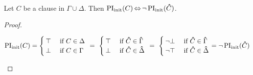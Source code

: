 \begin{lemma}
	\label{lemma:symmetry_base}
	Let $C$ be a clause in $\Gamma \cup \Delta$.
	Then $\operatorname{PI}_{\mathrm{init}}(C) \operatorname{\Leftrightarrow} \lnot \operatorname{PI}_{\mathrm{init}}(\bm\hat{C})$. 
\end{lemma}
\begin{proof}
	\begin{adjustwidth}{-1em}{}
		\[
		\operatorname{PI}_{\mathrm{init}}(C) =
	\begin{cases} \top & \text{ if $C \in \Delta$} \\ \bot & \text{ if $C \in \Gamma$}\end{cases}
	\;\,{=}\;\, \begin{cases} \top & \text{ if $\bm\hat{C} \in \bm\hat{\Gamma}$} \\ \bot & \text{ if $\bm\hat{C} \in \bm\hat{\Delta}$}\end{cases}\\
		\;\,{=}\;\,
	\begin{cases} \lnot \bot & \text{ if $\bm\hat{C} \in \bm\hat{\Gamma}$} \\ \lnot \top & \text{ if $\bm\hat{C} \in \bm\hat{\Delta}$}\end{cases}
		=
		\lnot \operatorname{PI}_{\mathrm{init}}(\bm\hat{C}) 
		\qedhere
	\]
	\end{adjustwidth}
\end{proof}

